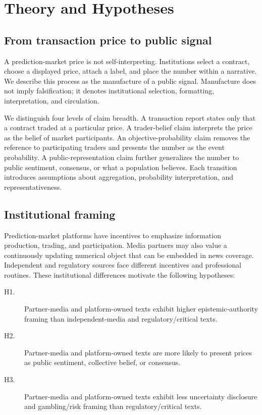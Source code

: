 \section{Theory and Hypotheses}

\subsection{From transaction price to public signal}

A prediction-market price is not self-interpreting. Institutions select a contract, choose a displayed price, attach a label, and place the number within a narrative. We describe this process as the manufacture of a public signal. Manufacture does not imply falsification; it denotes institutional selection, formatting, interpretation, and circulation.

We distinguish four levels of claim breadth. A transaction report states only that a contract traded at a particular price. A trader-belief claim interprets the price as the belief of market participants. An objective-probability claim removes the reference to participating traders and presents the number as the event probability. A public-representation claim further generalizes the number to public sentiment, consensus, or what a population believes. Each transition introduces assumptions about aggregation, probability interpretation, and representativeness.

\subsection{Institutional framing}

Prediction-market platforms have incentives to emphasize information production, trading, and participation. Media partners may also value a continuously updating numerical object that can be embedded in news coverage. Independent and regulatory sources face different incentives and professional routines. These institutional differences motivate the following hypotheses:

\begin{description}
\item[H1.] Partner-media and platform-owned texts exhibit higher epistemic-authority framing than independent-media and regulatory/critical texts.
\item[H2.] Partner-media and platform-owned texts are more likely to present prices as public sentiment, collective belief, or consensus.
\item[H3.] Partner-media and platform-owned texts exhibit less uncertainty disclosure and gambling/risk framing than regulatory/critical texts.
\end{description}

